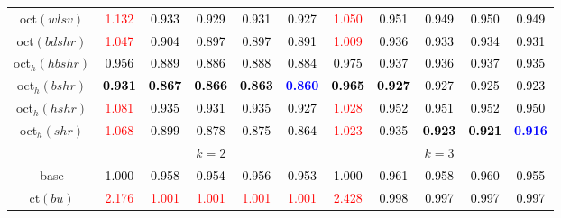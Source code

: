 \begin{tabular}[t]{c|>{}cccc>{}c|ccccc}
oct$(wlsv)$ & \textcolor{red}{1.132} & \textcolor{black}{0.933} & \textcolor{black}{0.929} & \textcolor{black}{0.931} & \textcolor{black}{0.927} & \textcolor{red}{1.050} & \textcolor{black}{0.951} & \textcolor{black}{0.949} & \textcolor{black}{0.950} & \textcolor{black}{0.949}\\
oct$(bdshr)$ & \textcolor{red}{1.047} & \textcolor{black}{0.904} & \textcolor{black}{0.897} & \textcolor{black}{0.897} & \textcolor{black}{0.891} & \textcolor{red}{1.009} & \textcolor{black}{0.936} & \textcolor{black}{0.933} & \textcolor{black}{0.934} & \textcolor{black}{0.931}\\
oct$_h(hbshr)$ & \textcolor{black}{0.956} & \textcolor{black}{0.889} & \textcolor{black}{0.886} & \textcolor{black}{0.888} & \textcolor{black}{0.884} & \textcolor{black}{0.975} & \textcolor{black}{0.937} & \textcolor{black}{0.936} & \textcolor{black}{0.937} & \textcolor{black}{0.935}\\
oct$_h(bshr)$ & \textcolor{black}{\textbf{0.931}} & \textcolor{black}{\textbf{0.867}} & \textcolor{black}{\textbf{0.866}} & \textcolor{black}{\textbf{0.863}} & \textcolor{blue}{\textbf{0.860}} & \textcolor{black}{\textbf{0.965}} & \textcolor{black}{\textbf{0.927}} & \textcolor{black}{0.927} & \textcolor{black}{0.925} & \textcolor{black}{0.923}\\
oct$_h(hshr)$ & \textcolor{red}{1.081} & \textcolor{black}{0.935} & \textcolor{black}{0.931} & \textcolor{black}{0.935} & \textcolor{black}{0.927} & \textcolor{red}{1.028} & \textcolor{black}{0.952} & \textcolor{black}{0.951} & \textcolor{black}{0.952} & \textcolor{black}{0.950}\\
oct$_h(shr)$ & \textcolor{red}{1.068} & \textcolor{black}{0.899} & \textcolor{black}{0.878} & \textcolor{black}{0.875} & \textcolor{black}{0.864} & \textcolor{red}{1.023} & \textcolor{black}{0.935} & \textcolor{black}{\textbf{0.923}} & \textcolor{black}{\textbf{0.921}} & \textcolor{blue}{\textbf{0.916}}\\
\addlinespace[0.3em]
\multicolumn{1}{c}{} & \multicolumn{5}{c}{\textbf{$k = 2$}} & \multicolumn{5}{c}{\textbf{$k = 3$}}\\
base & \textcolor{black}{1.000} & \textcolor{black}{0.958} & \textcolor{black}{0.954} & \textcolor{black}{0.956} & \textcolor{black}{0.953} & \textcolor{black}{1.000} & \textcolor{black}{0.961} & \textcolor{black}{0.958} & \textcolor{black}{0.960} & \textcolor{black}{0.955}\\
ct$(bu)$ & \textcolor{red}{2.176} & \textcolor{red}{1.001} & \textcolor{red}{1.001} & \textcolor{red}{1.001} & \textcolor{red}{1.001} & \textcolor{red}{2.428} & \textcolor{black}{0.998} & \textcolor{black}{0.997} & \textcolor{black}{0.997} & \textcolor{black}{0.997}\\

\end{tabular}

